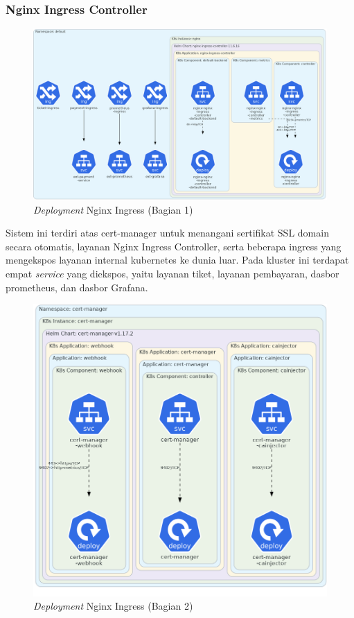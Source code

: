\pagebreak

\subsubsection{Nginx Ingress Controller}

\begin{figure}[htbp]
    \centering
    \includegraphics[width=1\textwidth]{resources/chapter-4/nginx-2.png}
    \caption{\textit{Deployment} Nginx Ingress (Bagian 1)}
    \label{fig:deployment-nginx-1}
\end{figure}

Sistem ini terdiri atas cert-manager untuk menangani sertifikat SSL domain secara otomatis, layanan Nginx Ingress Controller, serta beberapa ingress yang mengekspos layanan internal kubernetes ke dunia luar. Pada kluster ini terdapat empat \textit{service} yang diekspos, yaitu layanan tiket, layanan pembayaran, dasbor prometheus, dan dasbor Grafana.

\begin{figure}[htbp]
    \centering
    \includegraphics[width=1\textwidth]{resources/chapter-4/nginx-1.png}
    \caption{\textit{Deployment} Nginx Ingress (Bagian 2)}
    \label{fig:deployment-nginx-2}
\end{figure}

